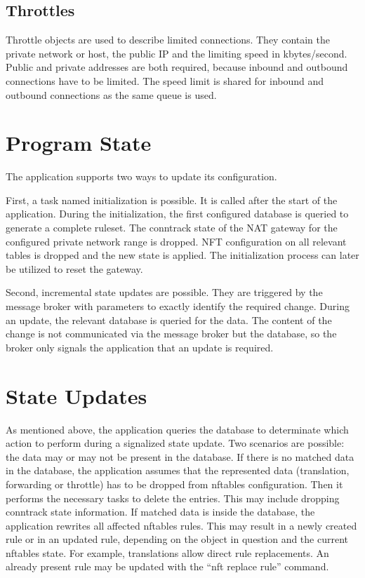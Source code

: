 \documentclass{report}
\begin{document}
\subsection{Throttles}\label{throttles}

Throttle objects are used to describe limited connections. They contain
the private network or host, the public IP and the limiting speed in
kbytes/second. Public and private addresses are both required, because
inbound and outbound connections have to be limited. The speed limit is
shared for inbound and outbound connections as the same queue is used.

\section{Program State}\label{program-state}

The application supports two ways to update its configuration.

First, a task named initialization is possible. It is called after
the start of the application. During the initialization, the first
configured database is queried to generate a complete ruleset. The
conntrack state of the NAT gateway for the configured private network range is
dropped. NFT configuration on all relevant tables is dropped and the
new state is applied. The initialization process can later be utilized
to reset the gateway.

Second, incremental state updates are possible. They are triggered by
the message broker with parameters to exactly identify the required
change. During an update, the relevant database is queried for the data.
The content of the change is not communicated via the message broker but
the database, so the broker only signals the application that an
update is required.

\section{State Updates}\label{state-updates}

As mentioned above, the application queries the database to determinate
which action to perform during a signalized state update. Two
scenarios are possible: the data may or may not be present in the
database.
If there is no matched data in the database, the application
assumes that the represented data (translation, forwarding or throttle)
has to be dropped from nftables configuration. Then it
performs the necessary tasks to delete the entries. This may include
dropping conntrack state information.
If matched data is inside the database, the application rewrites
all affected nftables rules. This may result in a newly created rule or
in an updated rule, depending on the object in question and the current
nftables state. For example, translations allow direct rule replacements.
An already present rule may be updated with the ``nft replace rule'' command.
\end{document}
